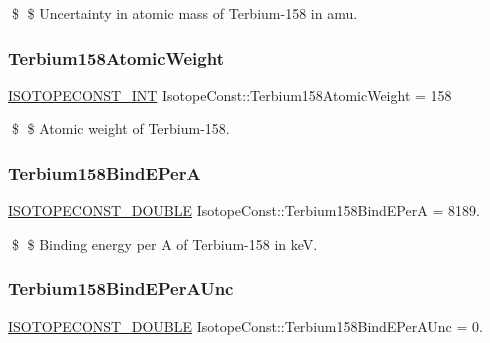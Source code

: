 \$ \$ Uncertainty in atomic mass of Terbium-\/158 in amu. \mbox{\label{group___isotope_const-_terbium-_tb158_ga21289202b69f66a8a1a619b4108b908e}} 
\subsubsection{\texorpdfstring{Terbium158\+Atomic\+Weight}{Terbium158AtomicWeight}}
{\footnotesize\ttfamily \mbox{\hyperlink{group___isotope_const-_macros_ga5f18360b3e99483a35c32d789e62621c}{I\+S\+O\+T\+O\+P\+E\+C\+O\+N\+S\+T\+\_\+\+I\+NT}} Isotope\+Const\+::\+Terbium158\+Atomic\+Weight = 158}

\$ \$ Atomic weight of Terbium-\/158. \mbox{\label{group___isotope_const-_terbium-_tb158_ga125de89d758ace2e5f13a064399babe4}} 
\subsubsection{\texorpdfstring{Terbium158\+Bind\+E\+PerA}{Terbium158BindEPerA}}
{\footnotesize\ttfamily \mbox{\hyperlink{group___isotope_const-_macros_ga8f45a7272ce02c0b4c65c44636ed719a}{I\+S\+O\+T\+O\+P\+E\+C\+O\+N\+S\+T\+\_\+\+D\+O\+U\+B\+LE}} Isotope\+Const\+::\+Terbium158\+Bind\+E\+PerA = 8189.}

\$ \$ Binding energy per A of Terbium-\/158 in keV. \mbox{\label{group___isotope_const-_terbium-_tb158_gac1df865c91b6d49f532c51bb663ed965}} 
\subsubsection{\texorpdfstring{Terbium158\+Bind\+E\+Per\+A\+Unc}{Terbium158BindEPerAUnc}}
{\footnotesize\ttfamily \mbox{\hyperlink{group___isotope_const-_macros_ga8f45a7272ce02c0b4c65c44636ed719a}{I\+S\+O\+T\+O\+P\+E\+C\+O\+N\+S\+T\+\_\+\+D\+O\+U\+B\+LE}} Isotope\+Const\+::\+Terbium158\+Bind\+E\+Per\+A\+Unc = 0.}

